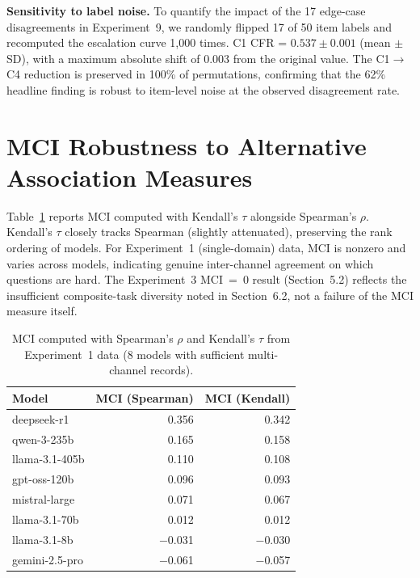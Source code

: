 \documentclass[10pt]{article}
\begin{document}
\textbf{Sensitivity to label noise.} To quantify the impact of the 17 edge-case
disagreements in Experiment~9, we randomly flipped 17 of 50 item labels and
recomputed the escalation curve 1,000 times. C1 CFR = $0.537 \pm 0.001$
(mean $\pm$ SD), with a maximum absolute shift of 0.003 from the original value.
The C1$\to$C4 reduction is preserved in 100\% of permutations, confirming that the
62\% headline finding is robust to item-level noise at the observed disagreement
rate.

\section{MCI Robustness to Alternative Association Measures}
\label{app:mci-robust}

Table~\ref{tab:mci-robustness} reports MCI computed with Kendall's $\tau$ alongside Spearman's $\rho$. Kendall's $\tau$ closely tracks Spearman (slightly attenuated), preserving the rank ordering of models. For Experiment~1 (single-domain) data, MCI is nonzero and varies across models, indicating genuine inter-channel agreement on which questions are hard. The Experiment~3 MCI~=~0 result (Section~5.2) reflects the insufficient composite-task diversity noted in Section~6.2, not a failure of the MCI measure itself.

\begin{table}[h]
\centering
\caption{MCI computed with Spearman's $\rho$ and Kendall's $\tau$ from Experiment~1 data (8 models with sufficient multi-channel records).}
\label{tab:mci-robustness}
\small
\begin{tabular}{lrr}
\toprule
Model & MCI (Spearman) & MCI (Kendall) \\
\midrule
deepseek-r1 & 0.356 & 0.342 \\
qwen-3-235b & 0.165 & 0.158 \\
llama-3.1-405b & 0.110 & 0.108 \\
gpt-oss-120b & 0.096 & 0.093 \\
mistral-large & 0.071 & 0.067 \\
llama-3.1-70b & 0.012 & 0.012 \\
llama-3.1-8b & $-$0.031 & $-$0.030 \\
gemini-2.5-pro & $-$0.061 & $-$0.057 \\
\bottomrule
\end{tabular}
\end{table}
\end{document}
